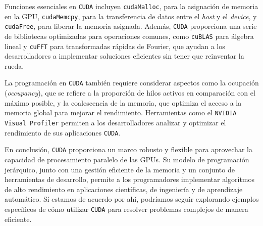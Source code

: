 Funciones esenciales en \texttt{CUDA} incluyen \texttt{cudaMalloc}, para la asignación de memoria en la GPU, \texttt{cudaMemcpy}, para la transferencia de datos entre el \emph{host} y el \emph{device}, y \texttt{cudaFree}, para liberar la memoria asignada. Además, \texttt{CUDA} proporciona una serie de bibliotecas optimizadas para operaciones comunes, como \texttt{cuBLAS} para álgebra lineal y \texttt{cuFFT} para transformadas rápidas de Fourier, que ayudan a los desarrolladores a implementar soluciones eficientes sin tener que reinventar la rueda.

La programación en \texttt{CUDA} también requiere considerar aspectos como la ocupación (\emph{occupancy}), que se refiere a la proporción de hilos activos en comparación con el máximo posible, y la coalescencia de la memoria, que optimiza el acceso a la memoria global para mejorar el rendimiento. Herramientas como el \texttt{NVIDIA Visual Profiler} permiten a los desarrolladores analizar y optimizar el rendimiento de sus aplicaciones \texttt{CUDA}.

En conclusión, \texttt{CUDA} proporciona un marco robusto y flexible para aprovechar la capacidad de procesamiento paralelo de las GPUs. Su modelo de programación jerárquico, junto con una gestión eficiente de la memoria y un conjunto de herramientas de desarrollo, permite a los programadores implementar algoritmos de alto rendimiento en aplicaciones científicas, de ingeniería y de aprendizaje automático. Sí estamos de acuerdo por ahí, podríamos seguir explorando ejemplos específicos de cómo utilizar \texttt{CUDA} para resolver problemas complejos de manera eficiente.